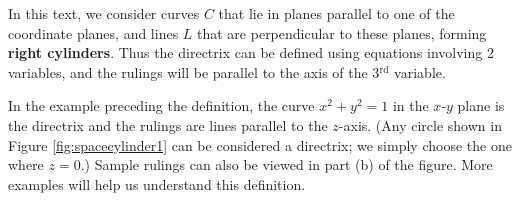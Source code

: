 In this text, we consider curves $C$ that lie in planes parallel to one of the coordinate planes, and lines $L$ that are perpendicular to these planes, forming \textbf{right cylinders}. Thus the directrix can be defined using equations involving 2 variables, and the rulings will be parallel to the axis of the 3$^\text{rd}$ variable.


In the example preceding the definition, the curve $x^2+y^2=1$ in the $x$-$y$ plane is the directrix and the rulings are lines parallel to the $z$-axis. (Any circle shown in Figure \ref{fig:spacecylinder1} can be considered a directrix; we simply choose the one where $z=0$.) Sample rulings can also be viewed in part (b) of the figure. More examples will help us understand this definition.\\

